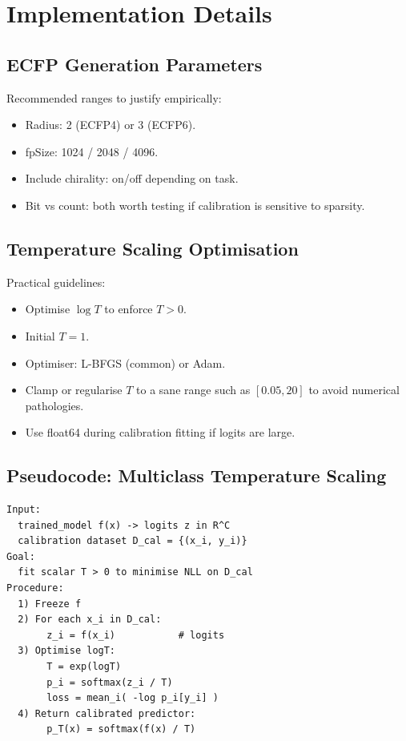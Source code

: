 \documentclass[11pt,a4paper,twocolumn]{article}
\begin{document}
\section{Implementation Details}
\label{sec:impl}

\subsection{ECFP Generation Parameters}
Recommended ranges to justify empirically:
\begin{itemize}
\item Radius: 2 (ECFP4) or 3 (ECFP6).
\item fpSize: 1024 / 2048 / 4096.
\item Include chirality: on/off depending on task.
\item Bit vs count: both worth testing if calibration is sensitive to
      sparsity.
\end{itemize}

\subsection{Temperature Scaling Optimisation}
Practical guidelines:
\begin{itemize}
\item Optimise $\log T$ to enforce $T>0$.
\item Initial $T=1$.
\item Optimiser: L-BFGS (common) or Adam.
\item Clamp or regularise $T$ to a sane range such as $[0.05, 20]$ to
      avoid numerical pathologies.
\item Use float64 during calibration fitting if logits are large.
\end{itemize}

\subsection{Pseudocode: Multiclass Temperature Scaling}

\begin{lstlisting}[language={},caption={Temperature scaling procedure.}]
Input:
  trained_model f(x) -> logits z in R^C
  calibration dataset D_cal = {(x_i, y_i)}
Goal:
  fit scalar T > 0 to minimise NLL on D_cal
Procedure:
  1) Freeze f
  2) For each x_i in D_cal:
       z_i = f(x_i)           # logits
  3) Optimise logT:
       T = exp(logT)
       p_i = softmax(z_i / T)
       loss = mean_i( -log p_i[y_i] )
  4) Return calibrated predictor:
       p_T(x) = softmax(f(x) / T)
\end{lstlisting}
\end{document}
